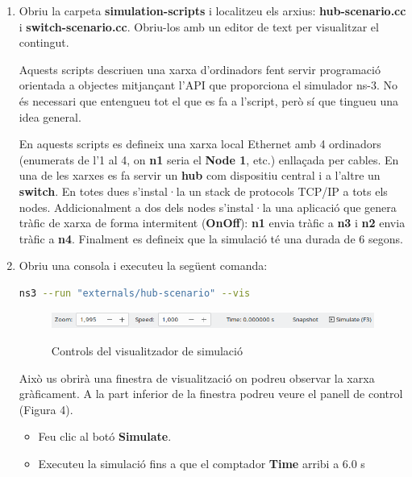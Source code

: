 \documentclass[12pt,a4paper]{article}
\begin{document}
\begin{enumerate}
\item Obriu la carpeta \textbf{simulation-scripts} i localitzeu els arxius: \textbf{hub-scenario.cc} i \textbf{switch-scenario.cc}. Obriu-los amb un editor de text per visualitzar el contingut.

Aquests scripts descriuen una xarxa d'ordinadors fent servir programació orientada a objectes mitjançant l'API que proporciona el simulador ns-3. No és necessari que entengueu tot el que es fa a l'script, però sí que tingueu una idea general.


En aquests scripts es defineix una xarxa local Ethernet amb 4 ordinadors (enumerats de l'1 al 4, on \textbf{n1} seria el \textbf{Node 1}, etc.) enllaçada per cables. En una de les xarxes es fa servir un \textbf{hub} com dispositiu central i a l'altre un \textbf{switch}. En totes dues s'instal·la un stack de protocols TCP/IP a tots els nodes. Addicionalment a dos dels nodes s'instal·la una aplicació que genera tràfic de xarxa de forma intermitent (\textbf{OnOff}): \textbf{n1} envia tràfic a \textbf{n3} i \textbf{n2} envia tràfic a \textbf{n4}. Finalment es defineix que la simulació té una durada de 6 segons.

\item Obriu una consola i executeu la següent comanda:
\begin{lstlisting}[language=bash]
   ns3 --run "externals/hub-scenario" --vis
\end{lstlisting}

\begin{figure}[!ht]

  \begin{center}
  \label{simulator}
    \includegraphics[width=1\textwidth]{simulator}
    \caption{Controls del visualitzador de simulació}
  \end{center}
\end{figure}
Això us obrirà una finestra de visualització on podreu observar la xarxa gràficament. A la part inferior de la finestra podreu veure el panell de control (Figura 4).

\begin{itemize}
 \item Feu clic al botó \textbf{Simulate}.
 \item Executeu la simulació fins a que el comptador \textbf{Time} arribi a 6.0 s
\end{itemize}


\end{enumerate}
\end{document}
